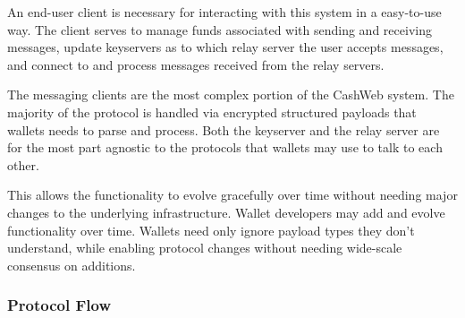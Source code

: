 \documentclass{article}
\begin{document}
An end-user client is necessary for interacting with this system in a easy-to-use way. The client serves to manage funds associated with sending and receiving messages, update keyservers as to which relay server the user accepts messages, and connect to and process messages received from the relay servers.

The messaging clients are the most complex portion of the CashWeb system. The majority of the protocol is handled via encrypted structured payloads that wallets needs to parse and process. Both the keyserver and the relay server are for the most part agnostic to the protocols that wallets may use to talk to each other.

This allows the functionality to evolve gracefully over time without needing major changes to the underlying infrastructure. Wallet developers may add and evolve functionality over time. Wallets need only ignore payload types they don't understand, while enabling protocol changes without needing wide-scale consensus on additions.

\subsubsection{Protocol Flow}

\begin{figure}[H]
  \begin{center}
  \end{center}
\end{figure}
\end{document}
